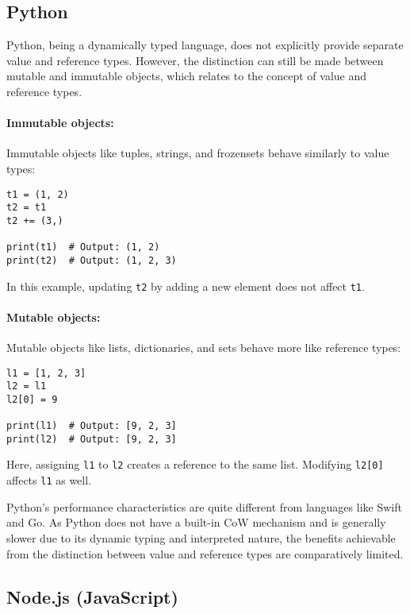 \subsection{Python}

Python, being a dynamically typed language, does not explicitly provide separate value and reference types. However, the distinction can still be made between mutable and immutable objects, which relates to the concept of value and reference types.

\paragraph{Immutable objects:}
Immutable objects like tuples, strings, and frozensets behave similarly to value types:

\begin{verbatim}
t1 = (1, 2)
t2 = t1
t2 += (3,)

print(t1)  # Output: (1, 2)
print(t2)  # Output: (1, 2, 3)
\end{verbatim}

In this example, updating \texttt{t2} by adding a new element does not affect \texttt{t1}.

\paragraph{Mutable objects:}
Mutable objects like lists, dictionaries, and sets behave more like reference types:

\begin{verbatim}
l1 = [1, 2, 3]
l2 = l1
l2[0] = 9

print(l1)  # Output: [9, 2, 3]
print(l2)  # Output: [9, 2, 3]
\end{verbatim}

Here, assigning \texttt{l1} to \texttt{l2} creates a reference to the same list. Modifying \texttt{l2[0]} affects \texttt{l1} as well.

Python's performance characteristics are quite different from languages like Swift and Go. As Python does not have a built-in CoW mechanism and is generally slower due to its dynamic typing and interpreted nature, the benefits achievable from the distinction between value and reference types are comparatively limited.

\subsection{Node.js (JavaScript)}

